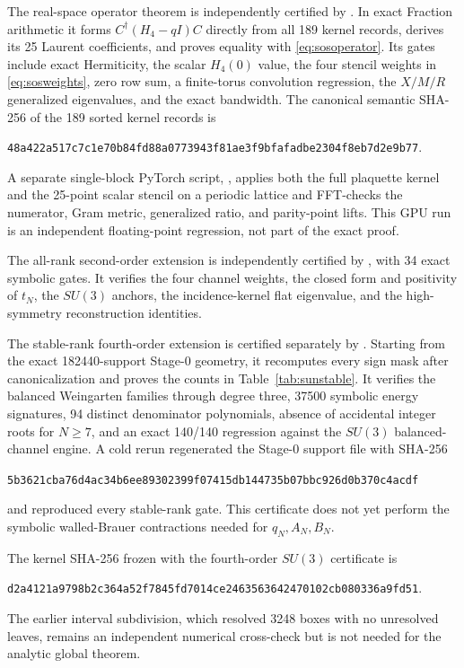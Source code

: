 \documentclass[11pt]{article}
\begin{document}
The real-space operator theorem is independently certified by
. In exact Fraction arithmetic
it forms $C^\dagger(H_4-qI)C$ directly from all 189 kernel records, derives
its 25 Laurent coefficients, and proves equality with
\eqref{eq:sosoperator}. Its gates include exact Hermiticity, the scalar
$H_4(0)$ value, the four stencil weights in \eqref{eq:sosweights}, zero row
sum, a finite-torus convolution regression, the $X/M/R$ generalized
eigenvalues, and the exact bandwidth. The canonical semantic SHA-256 of the
189 sorted kernel records is
\begin{center}
\texttt{48a422a517c7c1e70b84fd88a0773943f81ae3f9bfafadbe2304f8eb7d2e9b77}.
\end{center}
A separate single-block PyTorch script,
, applies both the full plaquette kernel and
the 25-point scalar stencil on a periodic lattice and FFT-checks the numerator,
Gram metric, generalized ratio, and parity-point lifts. This GPU run is an
independent floating-point regression, not part of the exact proof.

The all-rank second-order extension is independently certified by
, with 34 exact symbolic
gates. It verifies the four channel weights, the closed form and positivity
of $t_N$, the $SU(3)$ anchors, the incidence-kernel flat eigenvalue, and the
high-symmetry reconstruction identities.

The stable-rank fourth-order extension is certified separately by
. Starting from the exact 182440-support
Stage-0 geometry, it recomputes every sign mask after canonicalization and
proves the counts in Table~\ref{tab:sunstable}. It verifies the balanced
Weingarten families through degree three, 37500 symbolic energy signatures,
94 distinct denominator polynomials, absence of accidental integer roots for
$N\geq7$, and an exact 140/140 regression against the $SU(3)$ balanced-channel
engine. A cold rerun regenerated the Stage-0 support file with SHA-256
\begin{center}
\texttt{5b3621cba76d4ac34b6ee89302399f07415db144735b07bbc926d0b370c4acdf}
\end{center}
and reproduced every stable-rank gate. This certificate does not yet perform
the symbolic walled-Brauer contractions needed for $q_N,A_N,B_N$.

The kernel SHA-256 frozen with the fourth-order $SU(3)$ certificate is
\begin{center}
\texttt{d2a4121a9798b2c364a52f7845fd7014ce2463563642470102cb080336a9fd51}.
\end{center}
The earlier interval subdivision, which resolved 3248 boxes with no
unresolved leaves, remains an independent numerical cross-check but is not
needed for the analytic global theorem.
\end{document}
